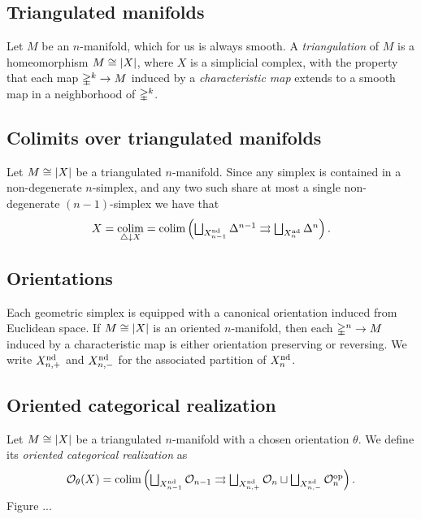 \subsection{Triangulated manifolds}

Let $M$ be an $n$-manifold, which for us is always smooth.
A \textit{triangulation} of $M$ is a homeomorphism $M \cong \lvert X\rvert$, where $X$ is a simplicial complex, with the property that each map $\mathbb{\Delta}^k \to M$ induced by a \textit{characteristic map} extends to a smooth map in a neighborhood of $\mathbb{\Delta}^k$.

\subsection{Colimits over triangulated manifolds}

Let $M \cong \lvert X\rvert$ be a triangulated $n$-manifold.
Since any simplex is contained in a non-degenerate $n$-simplex, and any two such share at most a single non-degenerate $(n-1)$-simplex we have that
\[
X = \operatorname*{colim}_{\triangle \downarrow X}
  = \textstyle \operatorname*{colim} \left(\bigsqcup_{X_{n-1}^{\mathrm{nd}}} \Delta^{n-1} \rightrightarrows \bigsqcup_{X_n^{\mathrm{nd}}} \Delta^n \right).
\]

\subsection{Orientations}

Each geometric simplex is equipped with a canonical orientation induced from Euclidean space.
If $M \cong \lvert X\rvert$ is an oriented $n$-manifold, then each $\mathbb{\Delta}^n \to M$ induced by a characteristic map is either orientation preserving or reversing.
We write $X_{n,+}^{\mathrm{nd}}$ and $X_{n,-}^{\mathrm{nd}}$ for the associated partition of $X_n^{\mathrm{nd}}$.

\subsection{Oriented categorical realization}

Let $M \cong \lvert X\rvert$ be a triangulated $n$-manifold with a chosen orientation $\theta$.
We define its \textit{oriented categorical realization} as
\[
\mathcal{O}_\theta(X) =
\textstyle \operatorname*{colim} \left(\bigsqcup_{X_{n-1}^{\mathrm{nd}}} \mathcal{O}_{n-1} \rightrightarrows \bigsqcup_{X_{n,+}^{\mathrm{nd}}} \mathcal{O}_n \sqcup \bigsqcup_{X_{n,-}^{\mathrm{nd}}} \mathcal{O}_n^{\mathrm{op}} \right).
\]
Figure ...